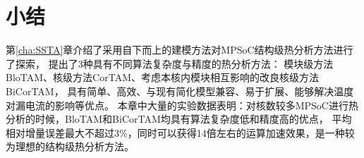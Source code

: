 \section{小结}
第\ref{cha:SSTA}章介绍了采用自下而上的建模方法对MPSoC结构级热分析方法进行了探索， 提出了3种具有不同算法复杂度与精度的热分析方法： 模块级方法BloTAM、核级方法CorTAM、考虑本核内模块相互影响的改良核级方法BiCorTAM， 具有简单、高效、与现有简化模型兼容、易于扩展、能够解决温度对漏电流的影响等优点。 本章中大量的实验数据表明：对核数较多MPSoC进行热分析的时候，BloTAM和BiCorTAM均具有算法复杂度低和精度高的优点， 平均相对增量误差最大不超过3\%，同时可以获得14倍左右的运算加速效果，是一种较为理想的结构级热分析方法。
